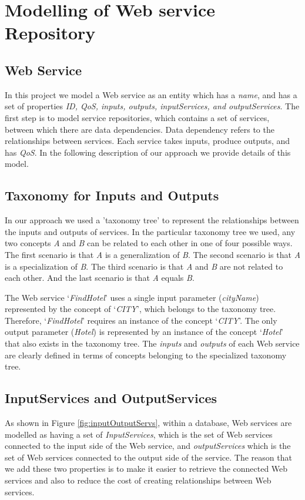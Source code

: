 \section{Modelling of Web service Repository} \label{procesedGD}
\subsection {Web Service}
In this project we model a Web service as an entity which has a \emph{name}, and has a set of properties \emph{ID, QoS, inputs, outputs, inputServices, and outputServices}. The first step is to model service repositories, which contains a set of services, between which there are data dependencies. Data dependency refers to the relationships between services. Each service takes inputs, produce outputs, and has \emph{QoS}. In the following description of our approach we provide details of this model.\par
\subsection {Taxonomy for Inputs and Outputs}
In our approach we used a {'}taxonomy tree{'} to represent the relationships between the inputs and outputs of services. In the particular taxonomy tree we used, any two concepts \emph{A} and \emph{B} can be related to each other in one of four possible ways. The first scenario is that \emph{A} is a generalization of \emph{B}. The second scenario is that \emph{A} is a specialization of \emph{B}. The third scenario is that \emph{A} and \emph{B} are not related to each other. And the last scenario is that  \emph{A} equals \emph{B}. 
\newcommand{\quotes}[1]{`#1'}
\begin{exmp}
The Web service \quotes{\emph{FindHotel}} uses a single input parameter (\emph{cityName}) represented by the concept of \quotes{\emph{CITY}}, which belongs to the taxonomy tree. Therefore, \quotes{\emph{FindHotel}} requires an instance of the concept \quotes{\emph{CITY}}. The only output parameter (\emph{Hotel}) is represented by an instance of the concept \quotes{\emph{Hotel}} that also exists in the taxonomy tree. The \emph{inputs} and \emph{outputs} of each Web service are clearly defined in terms of concepts belonging to the specialized taxonomy tree.
\end{exmp}


\subsection {InputServices and OutputServices}
As shown in Figure \ref{fig:inputOutputServs}, within a database, Web services are modelled as having a set of \emph{InputServices}, which is the set of Web services connected to the input side of the Web service, and  \emph{outputServices} which is the set of Web services connected to the output side of the service. The reason that we add these two properties is to make it easier to retrieve the connected Web services and also to reduce the cost of creating relationships between Web services. \par


